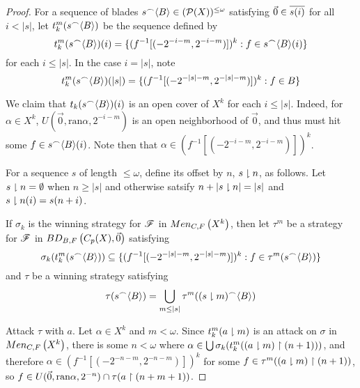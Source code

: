 \documentclass[11pt]{article}
\begin{document}
  \begin{proof}
    For a sequence of blades
    \(s{^\frown}\langle B\rangle\in(\mathcal{P}(X))^{\leq\omega}\) satisfying
    \(\vec 0\in \overline{s(i)}\) for all \(i<|s|\), let
    \(t_k^m(s{^\frown}\langle B\rangle)\) be the sequence defined by
      \[
        t_k^m(s{^\frown}\langle B\rangle)(i)
          =
        \{
          (f^{-1}[(-2^{-i-m},2^{-i-m})])^k
        :
          f\in s{^\frown}\langle B\rangle(i)
        \}
      \]
    for each \(i\leq|s|\). In the case \(i=|s|\), note
      \[
        t_k^m(s{^\frown}\langle B\rangle)(|s|)
          =
        \{
          (f^{-1}[(-2^{-|s|-m},2^{-|s|-m})])^k
        :
          f\in B
        \}
      \]

    We claim that \(t_k(s{^\frown}\langle B\rangle)(i)\) is an open cover of \(X^k\) for
    each \(i\leq|s|\).
    Indeed, for \(\alpha\in X^k\), \(U(\vec 0,\text{ran}\alpha,2^{-i-m})\) is
    an open neighborhood of \(\vec 0\), and thus must hit some
    \(f\in s{^\frown}\langle B\rangle(i)\). Note then that
    \(\alpha\in(f^{-1}[(-2^{-i-m},2^{-i-m})])^k\).

    For a sequence \(s\) of length \(\leq\omega\), define its offset by
    \(n\), \(s\downharpoonright n\), as follows. Let
    \(s\downharpoonright n=\emptyset\) when \(n\geq|s|\) and otherwise
    satsify \(n+|s\downharpoonright n|=|s|\) and \(s\downharpoonright n(i)=s(n+i)\).

    If \(\sigma_k\) is the winning strategy for \(\mathscr{F}\) in \(Men_{C,F}\left({X^k}\right)\),
    then let \(\tau^m\) be a strategy for \(\mathscr{F}\) in
    \(BD_{B,F}\left({C_p(X)},{\vec 0}\right)\) satisfying
      \[
        \sigma_k(t_k^m(s{^\frown}\langle B\rangle))
          \subseteq
        \{
          (f^{-1}[(-2^{-|s|-m},2^{-|s|-m})])^k
        :
          f\in \tau^m(s{^\frown}\langle B\rangle)
        \}
      \]
    and \(\tau\) be a winning strategy satisfying
      \[
        \tau(s{^\frown}\langle B\rangle)
          =
        \bigcup_{m\leq|s|}
        \tau^m((s\downharpoonright m){^\frown}\langle B\rangle)
      \]

    Attack \(\tau\) with \(a\). Let \(\alpha\in X^k\) and \(m<\omega\).
    Since \(t_k^m(a\downharpoonright m)\) is an attack on \(\sigma\) in
    \(Men_{C,F}\left({X^k}\right)\), there is some \(n<\omega\) where
    \(\alpha\in\bigcup\sigma_k(t_k^m((a\downharpoonright m)\restriction(n+1)))\),
    and therefore \(\alpha\in (f^{-1}[(-2^{-n-m},2^{-n-m})])^k\) for
    some \(f\in\tau^m((a\downharpoonright m)\restriction(n+1))\), so
    \(
      f
        \in
      U(\vec 0,\text{ran}\alpha,2^{-n})
        \cap
      \tau(a\restriction(n+m+1))
    \).
  \end{proof}

\newpage


\end{document}
